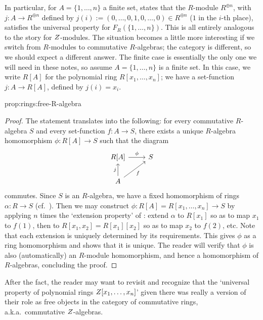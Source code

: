 In particular, for $A = \{1, \ldots, n\}$ a finite set,
 states that the $R$-module
$R^{\oplus n}$, with $j : A \to R^{\oplus n}$ defined by
$j(i) := (0, \ldots, 0, 1, 0, \ldots, 0) \in R^{\oplus n}$ ($1$ in the
$i$-th place), satisfies the universal property for
$F_R(\{1, \ldots, n\})$.  This is all entirely analogous to the story
for $Z$-modules. The situation becomes a little more interesting if
we switch from $R$-modules to commutative $R$-algebras; the category
is different, so we should expect a different answer. The finite case
is essentially the only one we will need in these notes, so assume
$A = \{1, \ldots, n\}$ is a finite set. In this case, we write $R[A]$
for the polynomial ring $R[x_1, \ldots, x_n]$; we have a set-function
$j : A \to R[A]$, defined by $j(i) = x_i$.

\begin{prop}{}{prop:rings:free-R-algebra}
\end{prop}
\begin{proof}
  The statement translates into the following: for every commutative
  $R$-algebra $S$ and every set-function $f : A \to S$, there exists a
  unique $R$-algebra homomorphism $\phi : R[A] \to S$ such that the
  diagram
  \[\begin{tikzcd}
      R[A] \arrow[r, "\phi"] & S \\
      A \arrow[u, "j"] \arrow[ur, "f"']
    \end{tikzcd}\] commutes. Since $S$ is an $R$-algebra, we have a
  fixed homomorphism of rings $\alpha : R \to S$ (cf.\
  ). Then we may construct
  $\phi : R[A] = R[x_1, \ldots, x_n] \to S$ by applying $n$ times the
  `extension property' of \Cref{exam:rings:poly-universal-general}:
  extend $\alpha$ to $R[x_1]$ so as to map $x_1$ to $f(1)$, then to
  $R[x_1, x_2] = R[x_1][x_2]$ so as to map $x_2$ to $f(2)$, etc. Note
  that each extension is uniquely determined by its requirements. This
  gives $\phi$ as a ring homomorphism and shows that it is unique. The
  reader will verify that $\phi$ is also (automatically) an $R$-module
  homomorphism, and hence a homomorphism of $R$-algebras, concluding
  the proof.
\end{proof}
After the fact, the reader may want to revisit
 and
recognize that the `universal property of polynomial rings
$Z[x_1, \ldots, x_n]$' given there was really a version of their role
as free objects in the category of commutative rings, a.k.a.\
commutative $Z$-algebras.

